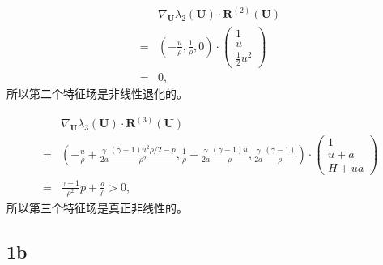 \documentclass[12pt]{article}
\begin{document}
\begin{align}
	&\nabla_{\boldsymbol{U}} \lambda_{2}(\boldsymbol{U}) \cdot \boldsymbol{R}^{(2)}(\boldsymbol{U}) \\
	=& \left(-\frac{u}{\rho},\frac{1}{\rho},0\right)\cdot \begin{pmatrix}
		1\\u\\\frac{1}{2}u^2
	\end{pmatrix}\\
	=&0,
\end{align}
所以第二个特征场是非线性退化的。

\begin{align}
	&\nabla_{\boldsymbol{U}} \lambda_{3}(\boldsymbol{U}) \cdot \boldsymbol{R}^{(3)}(\boldsymbol{U}) \\
	=& \left(-\frac{u}{\rho}+\frac{\gamma}{2a} \frac{(\gamma-1)u^2\rho/2-p}{\rho^2},\frac{1}{\rho}-\frac{\gamma}{2a}\frac{(\gamma-1)u}{\rho},\frac{\gamma}{2a}\frac{(\gamma-1)}{\rho}\right)\cdot \begin{pmatrix}
		1\\u+a\\H+ua
	\end{pmatrix}\\
	=&\frac{\gamma-1}{\rho^2}p+\frac{a}{\rho}>0,
\end{align}
所以第三个特征场是真正非线性的。

\subsection{1b}
\end{document}
